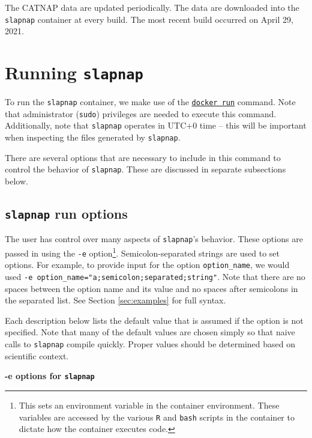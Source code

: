 \documentclass[]{article}
\begin{document}
The CATNAP data are updated periodically. The data are downloaded into
the \texttt{slapnap} container at every build. The most recent build
occurred on April 29, 2021.

\section{\texorpdfstring{Running
\texttt{slapnap}}{Running slapnap}}\label{sec:runningcontainer}

To run the \texttt{slapnap} container, we make use of the
\href{https://docs.docker.com/engine/reference/run/}{\texttt{docker\ run}}
command. Note that administrator (\texttt{sudo}) privileges are needed
to execute this command. Additionally, note that \texttt{slapnap}
operates in UTC+0 time -- this will be important when inspecting the
files generated by \texttt{slapnap}.

There are several options that are necessary to include in this command
to control the behavior of \texttt{slapnap}. These are discussed in
separate subsections below.

\subsection{\texorpdfstring{\texttt{slapnap} run
options}{slapnap run options}}\label{sec:opts}

The user has control over many aspects of \texttt{slapnap}'s behavior.
These options are passed in using the \texttt{-e} option\footnote{This
  sets an environment variable in the container environment. These
  variables are accessed by the various \texttt{R} and \texttt{bash}
  scripts in the container to dictate how the container executes code.}.
Semicolon-separated strings are used to set options. For example, to
provide input for the option \texttt{option\_name}, we would used
\texttt{-e\ option\_name="a;semicolon;separated;string"}. Note that
there are no spaces between the option name and its value and no spaces
after semicolons in the separated list. See Section \ref{sec:examples}
for full syntax.

Each description below lists the default value that is assumed if the
option is not specified. Note that many of the default values are chosen
simply so that naive calls to \texttt{slapnap} compile quickly. Proper
values should be determined based on scientific context.

\textbf{-e options for \texttt{slapnap}}
\end{document}
